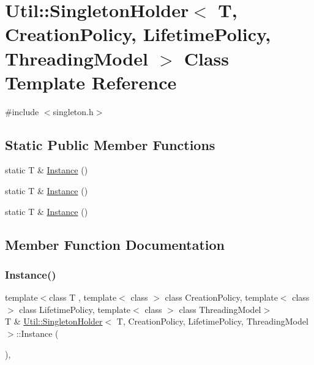 \hypertarget{classUtil_1_1SingletonHolder}{}\section{Util\+:\+:Singleton\+Holder$<$ T, Creation\+Policy, Lifetime\+Policy, Threading\+Model $>$ Class Template Reference}
\label{classUtil_1_1SingletonHolder}


{\ttfamily \#include $<$singleton.\+h$>$}

\subsection*{Static Public Member Functions}
\begin{DoxyCompactItemize}
\item 
static T \& \mbox{\hyperlink{classUtil_1_1SingletonHolder_aaebc14e9f950be2eb5f30207db23e2f5}{Instance}} ()
\item 
static T \& \mbox{\hyperlink{classUtil_1_1SingletonHolder_ab7cd7d81731ce5e022f12724dad02230}{Instance}} ()
\item 
static T \& \mbox{\hyperlink{classUtil_1_1SingletonHolder_ab7cd7d81731ce5e022f12724dad02230}{Instance}} ()
\end{DoxyCompactItemize}


\subsection{Member Function Documentation}
\mbox{\label{classUtil_1_1SingletonHolder_aaebc14e9f950be2eb5f30207db23e2f5}} 
\subsubsection{\texorpdfstring{Instance()}{Instance()}\hspace{0.1cm}{\footnotesize\ttfamily [1/3]}}
{\footnotesize\ttfamily template$<$class T , template$<$ class $>$ class Creation\+Policy, template$<$ class $>$ class Lifetime\+Policy, template$<$ class $>$ class Threading\+Model$>$ \\
T \& \mbox{\hyperlink{classUtil_1_1SingletonHolder}{Util\+::\+Singleton\+Holder}}$<$ T, Creation\+Policy, Lifetime\+Policy, Threading\+Model $>$\+::Instance (\begin{DoxyParamCaption}{ }\end{DoxyParamCaption})\hspace{0.3cm}{\ttfamily [inline]}, {\ttfamily [static]}}

